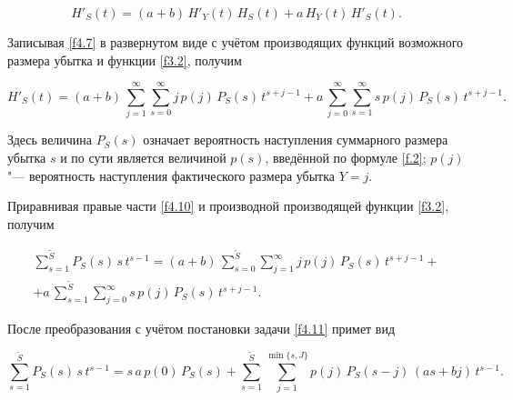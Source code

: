 \begin{equation}

\label{f4.7}

H'_S(t)=(a+b)\, H'_Y(t) \, H_S(t)+a \, H_Y(t) \, H'_S(t).

\end{equation}

Записывая \eqref{f4.7} в развернутом виде с учётом производящих функций возможного размера убытка и функции \eqref{f3.2}, получим

\begin{equation}

\label{f4.10}

H'_S(t)=(a+b)\, \sum_{j=1}^\infty \sum_{s=0}^\infty j \, p(j) \, P_S(s) \, t^{s+j-1}+a \, \sum_{j=0}^\infty \sum_{s=1}^\infty 

s \, p(j) \, P_S(s) \, t^{s+j-1}.

\end{equation}

Здесь величина $P_S(s)$ означает вероятность наступления суммарного размера убытка $s$ и по сути является величиной $p(s)$, введённой по формуле \eqref{f.2};  $p(j)$ "--- вероятность наступления фактического размера убытка $Y=j$.



Приравнивая правые части \eqref{f4.10} и производной производящей функции \eqref{f3.2}, получим

\begin{multline}

\label{f4.11}

\sum_{s=1}^{\widetilde S} P_S(s) \, s \, t^{s-1} =

(a+b) \, \sum_{s=0}^{\widetilde S} \sum_{j=1}^\infty j \, p(j) \, P_S(s) \, t^{s+j-1}+\\

+ a\, \sum_{s=1}^{\widetilde S} \sum_{j=0}^\infty s \,p(j) \,P_S(s)\, t^{s+j-1}.

\end{multline}

После преобразования с учётом постановки задачи  \eqref{f4.11} примет вид

\begin{equation}

\label{f4.12}

 \sum_{s=1}^{\widetilde S} P_S(s)\, s\, t^{s-1} = s\, a\, p(0)\, P_S(s)

 + \sum_{s=1}^{\widetilde S} \sum_{j=1}^{\min\{s, J\}} p(j)\, P_S(s-j)\, (as+bj) \,t^{s-1}.

\end{equation}

